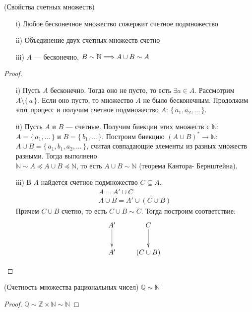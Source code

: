 \begin{theorem}(Свойства счетных множеств)
    \begin{itemize}
        \item[i)] Любое бесконечное множество сожержит счетное подмножество
        \item[ii)] Объединение двух счетных множеств счетно
        \item[iii)] $A$ --- бесконечно, $B \sim \mathbb{N} \Longrightarrow A \cup B \sim A$
    \end{itemize}
\end{theorem}
\begin{proof}
    \enewline
    \begin{itemize}
        \item[i)] Пусть $A$ бесконечно. Тогда оно не пусто, то есть $\exists a
        \in A$. Рассмотрим $A \setminus \{\, a \,\}$. Если оно пусто, то
        множество $A$ не было бесконечным. Продолжим этот процесс и получим
        cчетное подмножество $A$: $\{\, a_1, a_2, \ldots \,\}$.
        \item[ii)] Пусть $A$ и $B$ --- счетные. Получим биекции этих множеств с
        $\mathbb{N}$: $A = \{\, a_1, \ldots \,\}$ и $B = \{\, b_1, \ldots \,\}$.
        Построим биекцию $(A \cup B)^* \to \mathbb{N}$: $A \cup B = \{\, a_1, b_1,
        a_2, \ldots \,\}$, считая совпадающие элементы из разных множеств разными.
        Тогда выполнено \\ $\mathbb{N} \sim A \preccurlyeq A \cup B \preccurlyeq
        \mathbb{N}$, то есть $A \cup B \sim \mathbb{N}$ (теорема Кантора-
        Бернштейна).
        \item[iii)] В $A$ найдется счетное подмножество $C \subseteq A$.
        \begin{gather*}
            A = A' \cup C \\
            A \cup B = A' \cup (C \cup B)
        \end{gather*}
        Причем $C \cup B$ счетно, то есть $C \cup B \sim C$. Тогда построим
        соответствие:
        \begin{displaymath}
            \xymatrix{
                A' \ar[d] & C \ar[d] \\
                A' & (C \cup B)
            }
        \end{displaymath}
    \end{itemize}
\end{proof}

\begin{theorem}(Счетность множества рациональных чисел)
    $\mathbb{Q} \sim \mathbb{N}$
\end{theorem}
\begin{proof}
    $\mathbb{Q} \sim \mathbb{Z} \times \mathbb{N} \sim \mathbb{N}$
\end{proof}

